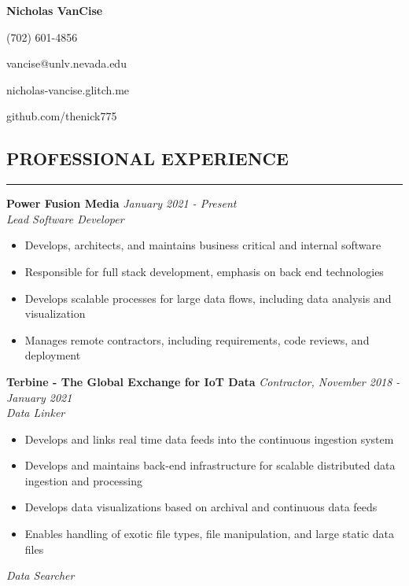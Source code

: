 \documentclass{res}
\begin{document}
	\thispagestyle{empty} %
	\centerline{\bf \Large{Nicholas VanCise}}
	\centerline{(702) 601-4856}
	\centerline{vancise@unlv.nevada.edu}
  \centerline{nicholas-vancise.glitch.me}
  \centerline{github.com/thenick775}
  \vspace{-18pt}

	\begin{resume}

		\section{{PROFESSIONAL EXPERIENCE}}
    \noindent\rule[0.5ex]{\linewidth}{1pt}
    		{\bf Power Fusion Media} \hfill \emph{January 2021 - Present} \\
			\emph{Lead Software Developer}

			\begin{itemize} \itemsep -2pt
				\item Develops, architects, and maintains business critical and internal software
				\item Responsible for full stack development, emphasis on back end technologies
				\item Develops scalable processes for large data flows, including data analysis and visualization
				\item Manages remote contractors, including requirements, code reviews, and deployment
			\end{itemize} \vspace{-2mm}
    
		{\bf Terbine - The Global Exchange for IoT Data} \hfill \emph{Contractor, November 2018 - January 2021} \\
			\emph{Data Linker}

			\begin{itemize} \itemsep -2pt
				\item Develops and links real time data feeds into the continuous ingestion system
				\item Develops and maintains back-end infrastructure for scalable distributed data ingestion and processing
				\item Develops data visualizations based on archival and continuous data feeds
				\item Enables handling of exotic file types, file manipulation, and large static data files
			\end{itemize} \vspace{-2mm}

			\emph{Data Searcher}


\end{resume}
\end{document}
